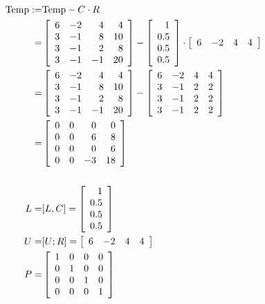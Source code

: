 \begin{align*}
    {\rm Temp}:=& {\rm Temp}-C \cdot R \\
    =& \left[\begin{array}{rrrr} 6 & -2 & 4 & 4\\ 3 & -1 & 8 & 10 \\ 3 & -1 & 2 & 8 \\3 & -1 & -1 & 20 \end{array}\right] 
    - \left[\begin{array}{r} 1 \\ 0.5 \\ 0.5 \\0.5 \end{array} \right] \cdot  \left[\begin{array}{rrrr} 6 & -2& 4 & 4 \end{array} \right] \\
    =& \left[\begin{array}{rrrr} 6 & -2 & 4 & 4\\ 3 & -1 & 8 & 10 \\ 3 & -1 & 2 & 8 \\3 & -1 & -1 & 20 \end{array}\right] 
    - \left[\begin{array}{rrrr} 6 & -2 & 4 & 4\\ 3 & -1 & 2 & 2 \\ 3 & -1 & 2 & 2 \\3 & -1 & 2 & 2 \end{array}\right]  \\
    =&  \left[\begin{array}{rrrr} 0 & 0 & 0 & 0\\ 0 & 0 & 6 & 8 \\ 0 & 0 & 0 & 6 \\0 & 0 & -3 & 18 \end{array}\right] \\
    \\
    L=&[L,C] = \left[\begin{array}{r}  1 \\ 0.5 \\ 0.5 \\ 0.5 \end{array} \right]\\
    U=&[U;R] = \left[\begin{array}{rrrr} 6 & -2 & 4 & 4  \end{array} \right] \\
    P =& \left[\begin{array}{rrrr} 1 & 0 & 0 & 0\\ 0 & 1 & 0 & 0 \\ 0 & 0 & 1 & 0 \\0 & 0 & 0 & 1 \end{array}\right] 
\end{align*}

